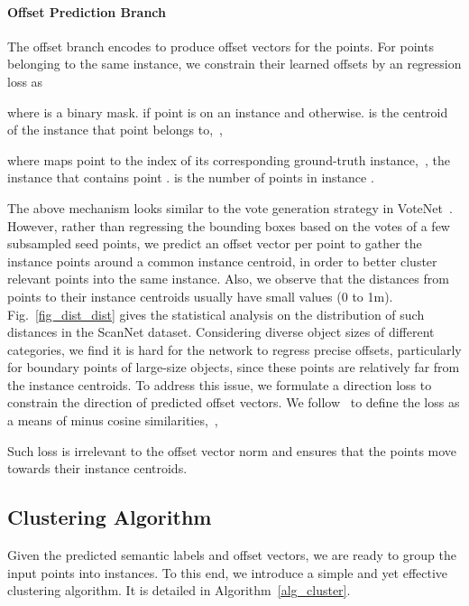 \documentclass[10pt,twocolumn,letterpaper]{article}
\begin{document}
\vspace*{-3mm}
\paragraph{Offset Prediction Branch}
The offset branch encodes  to produce  offset vectors  for the  points.
For points belonging to the same instance, we constrain their learned offsets by an  regression loss as

where  is a binary mask.  if point  is on an instance and  otherwise.
 is the centroid of the instance that point  belongs to,~\ie,

where  maps point  to the index of its corresponding ground-truth instance,~\ie, the instance that contains point .  is the number of points in instance .


The above mechanism looks similar to the vote generation strategy in VoteNet~\cite{qi2019deep}.
However, rather than regressing the bounding boxes based on the votes of a few subsampled seed points, we predict an offset vector per point to gather the instance points around a common instance centroid, in order to better cluster relevant points into the same instance.
Also, we observe that the distances from points to their instance centroids usually have small values (0 to 1m). Fig.~\ref{fig_dist_dist} gives the statistical analysis on the distribution of such distances in the ScanNet dataset.
Considering diverse object sizes of different categories,
we find it is hard for the network to regress precise offsets, particularly for boundary points of large-size objects, since these points are relatively far from the instance centroids.
To address this issue, we formulate a direction loss to constrain the direction of predicted offset vectors. We follow~\cite{lahoud20193d} to define the loss as a means of minus cosine similarities,~\ie,

Such loss is irrelevant to the offset vector norm and ensures that the points move towards their instance centroids.






\subsection{Clustering Algorithm}
Given the predicted semantic labels and offset vectors, we are ready to group the input points into instances. To this end, we introduce a simple and yet effective clustering algorithm. 
It is detailed in Algorithm~\ref{alg_cluster}. 
\end{document}
